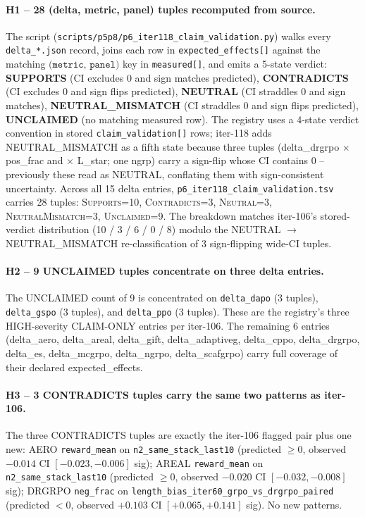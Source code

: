 \paragraph{H1 -- 28 (delta, metric, panel) tuples recomputed from source.}
The script (\texttt{scripts/p5p8/p6\_iter118\_claim\_validation.py}) walks
every \texttt{delta\_*.json} record, joins each row in
\texttt{expected\_effects[]} against the matching $\texttt{(metric, panel)}$
key in \texttt{measured[]}, and emits a 5-state verdict:
\textbf{SUPPORTS} (CI excludes 0 and sign matches predicted),
\textbf{CONTRADICTS} (CI excludes 0 and sign flips predicted),
\textbf{NEUTRAL} (CI straddles 0 and sign matches),
\textbf{NEUTRAL\_MISMATCH} (CI straddles 0 and sign flips predicted),
\textbf{UNCLAIMED} (no matching measured row). The registry uses a 4-state
verdict convention in stored \texttt{claim\_validation[]} rows; iter-118
adds NEUTRAL\_MISMATCH as a fifth state because three tuples (delta\_drgrpo
$\times$ pos\_frac and $\times$ L\_star; one ngrp) carry a sign-flip whose
CI contains 0 -- previously these read as NEUTRAL, conflating them with
sign-consistent uncertainty. Across all 15 delta entries,
\texttt{p6\_iter118\_claim\_validation.tsv} carries 28 tuples:
\textsc{Supports}=10, \textsc{Contradicts}=3, \textsc{Neutral}=3,
\textsc{NeutralMismatch}=3, \textsc{Unclaimed}=9.
The breakdown matches iter-106's stored-verdict distribution (10 / 3 / 6 /
0 / 8) modulo the NEUTRAL $\to$ NEUTRAL\_MISMATCH re-classification of 3
sign-flipping wide-CI tuples.

\paragraph{H2 -- 9 UNCLAIMED tuples concentrate on three delta entries.}
The UNCLAIMED count of 9 is concentrated on \texttt{delta\_dapo}
(3 tuples), \texttt{delta\_gspo} (3 tuples), and \texttt{delta\_ppo}
(3 tuples). These are the registry's three HIGH-severity CLAIM-ONLY
entries per iter-106. The remaining 6 entries (delta\_aero, delta\_areal,
delta\_gift, delta\_adaptiveg, delta\_cppo, delta\_drgrpo, delta\_es,
delta\_mcgrpo, delta\_ngrpo, delta\_scafgrpo) carry full coverage of
their declared expected\_effects.

\paragraph{H3 -- 3 CONTRADICTS tuples carry the same two patterns as iter-106.}
The three CONTRADICTS tuples are exactly the iter-106 flagged pair plus
one new: AERO \texttt{reward\_mean} on \texttt{n2\_same\_stack\_last10}
(predicted $\geq 0$, observed $-0.014$ CI $[-0.023, -0.006]$ sig);
AREAL \texttt{reward\_mean} on \texttt{n2\_same\_stack\_last10}
(predicted $\geq 0$, observed $-0.020$ CI $[-0.032, -0.008]$ sig);
DRGRPO \texttt{neg\_frac} on
\texttt{length\_bias\_iter60\_grpo\_vs\_drgrpo\_paired}
(predicted $< 0$, observed $+0.103$ CI $[+0.065, +0.141]$ sig). No new
patterns.

